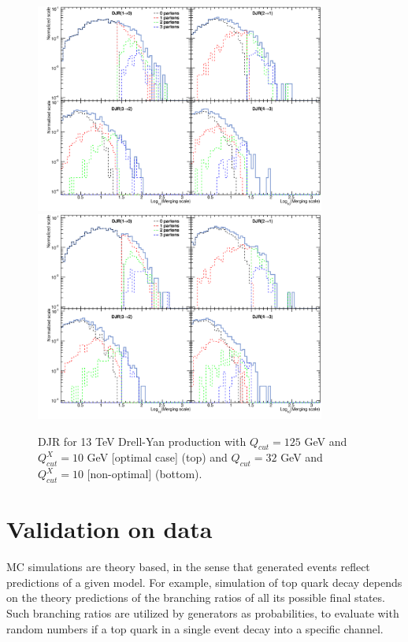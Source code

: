 \begin{figure}[!Hhtbp]
  \begin{center}
    \includegraphics[width=0.85\textwidth]{figs/DJR_q25_xq10_DYJets13TeV.png}
    \includegraphics[width=0.85\textwidth]{figs/DJR_q32_xq10_DYJets13TeV.png}
    \caption{DJR for 13 TeV Drell-Yan production with $Q_{cut}=125$ GeV and $Q^{X}_{cut}=10$ GeV [optimal case] (top) and $Q_{cut}=32$ GeV and $Q^{X}_{cut}=10$ [non-optimal] (bottom).}
    \label{fig:DYMerging}
  \end{center}
\end{figure}

\section{Validation on data}
\label{sec:val}

MC simulations are theory based, in the sense that generated events reflect predictions of a given model. For example, simulation of top quark decay depends on the theory predictions of the branching ratios of all its possible final states. Such branching ratios are utilized by generators as probabilities, to evaluate with random numbers if a top quark in a single event decay into a specific channel. 

